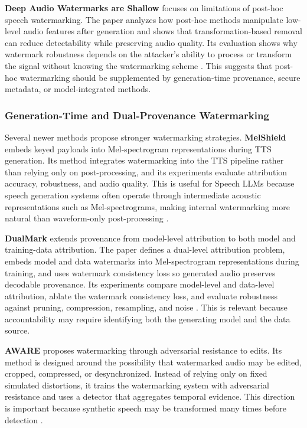 \textbf{Deep Audio Watermarks are Shallow} focuses on limitations of post-hoc speech watermarking. The paper analyzes how post-hoc methods manipulate low-level audio features after generation and shows that transformation-based removal can reduce detectability while preserving audio quality. Its evaluation shows why watermark robustness depends on the attacker's ability to process or transform the signal without knowing the watermarking scheme \citep{oreilly2025deepaudiowatermarksshallow}. This suggests that post-hoc watermarking should be supplemented by generation-time provenance, secure metadata, or model-integrated methods.

\subsubsection{Generation-Time and Dual-Provenance Watermarking}

Several newer methods propose stronger watermarking strategies. \textbf{MelShield} embeds keyed payloads into Mel-spectrogram representations during TTS generation. Its method integrates watermarking into the TTS pipeline rather than relying only on post-processing, and its experiments evaluate attribution accuracy, robustness, and audio quality. This is useful for Speech LLMs because speech generation systems often operate through intermediate acoustic representations such as Mel-spectrograms, making internal watermarking more natural than waveform-only post-processing \citep{jin2026melshieldrobustmeldomainaudio}.

\textbf{DualMark} extends provenance from model-level attribution to both model and training-data attribution. The paper defines a dual-level attribution problem, embeds model and data watermarks into Mel-spectrogram representations during training, and uses watermark consistency loss so generated audio preserves decodable provenance. Its experiments compare model-level and data-level attribution, ablate the watermark consistency loss, and evaluate robustness against pruning, compression, resampling, and noise \citep{yang2025dualmarkidentifyingmodeltraining}. This is relevant because accountability may require identifying both the generating model and the data source.

\textbf{AWARE} proposes watermarking through adversarial resistance to edits. Its method is designed around the possibility that watermarked audio may be edited, cropped, compressed, or desynchronized. Instead of relying only on fixed simulated distortions, it trains the watermarking system with adversarial resistance and uses a detector that aggregates temporal evidence. This direction is important because synthetic speech may be transformed many times before detection \citep{pavlović2026awareaudiowatermarkingadversarial}.


